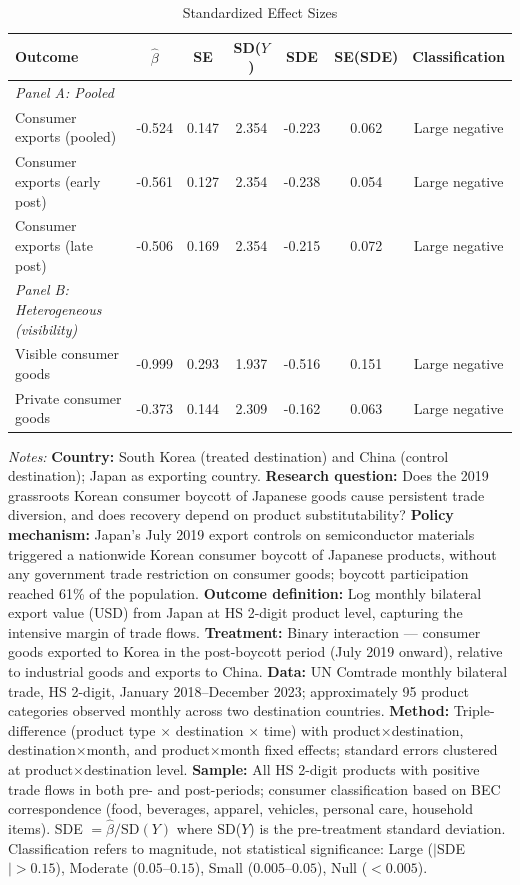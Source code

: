 \begin{table}[htbp]
\centering
\caption{Standardized Effect Sizes}
\label{tab:sde}
{\small
\begin{threeparttable}
\begin{tabular}{lcccccc}
\toprule
Outcome & $\hat{\beta}$ & SE & SD($Y$) & SDE & SE(SDE) & Classification \\
\midrule
\textit{Panel A: Pooled} & & & & & & \\
Consumer exports (pooled) & -0.524 & 0.147 & 2.354 & -0.223 & 0.062 & Large negative \\
Consumer exports (early post) & -0.561 & 0.127 & 2.354 & -0.238 & 0.054 & Large negative \\
Consumer exports (late post) & -0.506 & 0.169 & 2.354 & -0.215 & 0.072 & Large negative \\
[6pt]
\textit{Panel B: Heterogeneous (visibility)} & & & & & & \\
Visible consumer goods & -0.999 & 0.293 & 1.937 & -0.516 & 0.151 & Large negative \\
Private consumer goods & -0.373 & 0.144 & 2.309 & -0.162 & 0.063 & Large negative \\
\bottomrule
\end{tabular}
\begin{tablenotes}[flushleft]\scriptsize
\item \textit{Notes:} \textbf{Country:} South Korea (treated destination) and China (control destination); Japan as exporting country. \textbf{Research question:} Does the 2019 grassroots Korean consumer boycott of Japanese goods cause persistent trade diversion, and does recovery depend on product substitutability? \textbf{Policy mechanism:} Japan's July 2019 export controls on semiconductor materials triggered a nationwide Korean consumer boycott of Japanese products, without any government trade restriction on consumer goods; boycott participation reached 61\% of the population. \textbf{Outcome definition:} Log monthly bilateral export value (USD) from Japan at HS 2-digit product level, capturing the intensive margin of trade flows. \textbf{Treatment:} Binary interaction --- consumer goods exported to Korea in the post-boycott period (July 2019 onward), relative to industrial goods and exports to China. \textbf{Data:} UN Comtrade monthly bilateral trade, HS 2-digit, January 2018--December 2023; approximately 95 product categories observed monthly across two destination countries. \textbf{Method:} Triple-difference (product type $\times$ destination $\times$ time) with product$\times$destination, destination$\times$month, and product$\times$month fixed effects; standard errors clustered at product$\times$destination level. \textbf{Sample:} All HS 2-digit products with positive trade flows in both pre- and post-periods; consumer classification based on BEC correspondence (food, beverages, apparel, vehicles, personal care, household items). SDE $= \hat{\beta} / \text{SD}(Y)$ where SD($Y$) is the pre-treatment standard deviation. Classification refers to magnitude, not statistical significance: Large ($|$SDE$| > 0.15$), Moderate ($0.05$--$0.15$), Small ($0.005$--$0.05$), Null ($< 0.005$).
\end{tablenotes}
\end{threeparttable}
}
\end{table}
